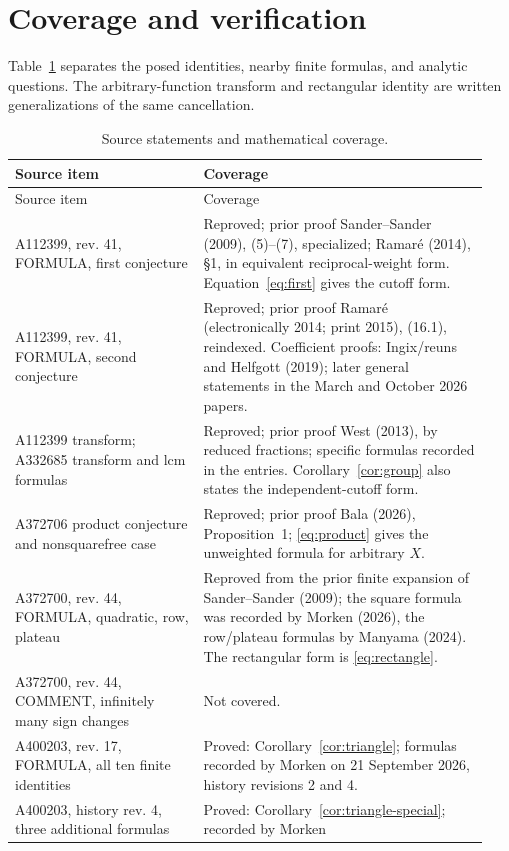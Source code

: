\documentclass[11pt]{article}
\begin{document}
\section{Coverage and verification}
Table~\ref{tab:coverage} separates the posed identities, nearby finite
formulas, and analytic questions. The arbitrary-function transform and
rectangular identity are written generalizations of the same cancellation.

\small
\begin{longtable}{@{}p{0.37\linewidth}p{0.57\linewidth}@{}}
\caption{Source statements and mathematical coverage.}\label{tab:coverage}\\
\toprule
Source item & Coverage\\
\midrule
\endfirsthead
\toprule Source item & Coverage\\ \midrule
\endhead
\bottomrule\endfoot
A112399, rev. 41, FORMULA, first conjecture &
Reproved; prior proof Sander--Sander (2009), (5)--(7), specialized;
Ramar\'e (2014), \S1, in equivalent reciprocal-weight form.
Equation~\eqref{eq:first} gives the cutoff form.\\
A112399, rev. 41, FORMULA, second conjecture &
Reproved; prior proof Ramar\'e (electronically 2014; print 2015),
(16.1), reindexed. Coefficient proofs: Ingix/reuns and Helfgott (2019);
later general statements in the March and October 2026 papers.\\
A112399 transform; A332685 transform and lcm formulas &
Reproved; prior proof West (2013), by reduced fractions;
specific formulas recorded in the entries. Corollary~\ref{cor:group}
also states the independent-cutoff form.\\
A372706 product conjecture and nonsquarefree case &
Reproved; prior proof Bala (2026), Proposition~1;
\eqref{eq:product} gives the unweighted formula for arbitrary $X$.\\
A372700, rev. 44, FORMULA, quadratic, row, plateau &
Reproved from the prior finite expansion of Sander--Sander (2009);
the square formula was recorded by Morken (2026), the row/plateau
formulas by Manyama (2024). The rectangular form is \eqref{eq:rectangle}.\\
A372700, rev. 44, COMMENT, infinitely many sign changes &
Not covered.\\
A400203, rev. 17, FORMULA, all ten finite identities &
Proved: Corollary~\ref{cor:triangle}; formulas recorded by Morken
on 21 September 2026, history revisions 2 and 4.\\
A400203, history rev. 4, three additional formulas &
Proved: Corollary~\ref{cor:triangle-special}; recorded by Morken

\end{longtable}
\end{document}
